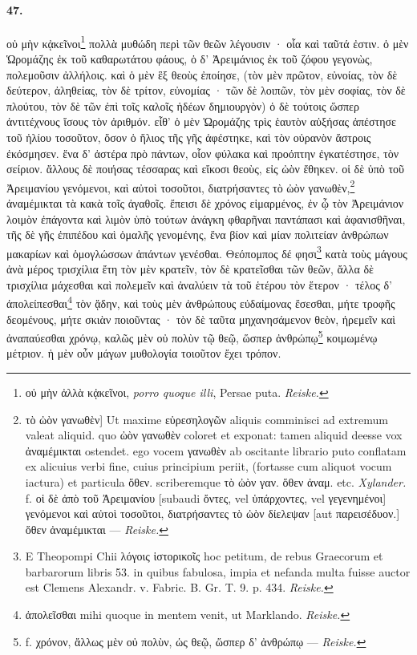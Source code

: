 \documentclass[a4paper, 11pt, oneside, polutonikogreek, german, landscape]{article}
\begin{document}
\paragraph{47.}
οὐ μὴν κᾀκεῖνοι\footnote{οὐ μὴν ἀλλὰ κᾀκεῖνοι, \emph{porro quoque illi}, Persae puta. \emph{Reiske.}} πολλὰ μυθώδη περὶ τῶν θεῶν λέγουσιν · οἷα καὶ ταῦτά ἐστιν. ὁ μὲν Ὡρομάζης ἐκ τοῦ καθαρωτάτου φάους, ὁ δ' Ἀρειμάνιος ἐκ τοῦ ζόφου γεγονὼς, πολεμοῦσιν ἀλλήλοις. καὶ ὁ μὲν ἓξ θεοὺς ἐποίησε, (τὸν μὲν πρῶτον, εὐνοίας, τὸν δὲ δεύτερον, ἀληθείας, τὸν δὲ τρίτον, εὐνομίας · τῶν δὲ λοιπῶν, τὸν μὲν σοφίας, τὸν δὲ πλούτου, τὸν δὲ τῶν ἐπὶ τοῖς καλοῖς ἡδέων δημιουργὸν) ὁ δὲ τούτοις ὥσπερ ἀντιτέχνους ἴσους τὸν ἀριθμόν. εἶθ' ὁ μὲν Ὡρομάζης τρὶς ἑαυτὸν αὐξήσας ἀπέστησε τοῦ ἡλίου τοσοῦτον, ὅσον ὁ ἥλιος τῆς γῆς ἀφέστηκε, καὶ τὸν οὐρανὸν ἄστροις ἐκόσμησεν. ἕνα δ' ἀστέρα πρὸ πάντων, οἷον φύλακα καὶ προόπτην ἐγκατέστησε, τὸν σείριον. ἄλλους δὲ ποιήσας τέσσαρας καὶ εἴκοσι θεοὺς, εἰς ὠὸν ἔθηκεν. οἱ δὲ ὑπὸ τοῦ Ἀρειμανίου γενόμενοι, καὶ αὐτοὶ τοσοῦτοι, διατρήσαντες τὸ ὠὸν γανωθὲν,\footnote{τὸ ὠὸν γανωθὲν] Ut maxime εὑρεσηλογῶν aliquis comminisci ad extremum valeat aliquid. quo ὠὸν γανωθὲν coloret et exponat: tamen aliquid deesse vox ἀναμέμικται ostendet. ego vocem γανωθὲν ab oscitante librario puto conflatam ex alicuius verbi fine, cuius principium periit, (fortasse cum aliquot vocum iactura) et particula ὅθεν. scriberemque τὸ ὠὸν γαν. ὅθεν ἀναμ. etc. \emph{Xylander.} f. οἱ δὲ ἀπὸ τοῦ Ἀρειμανίου [subaudi ὄντες, vel ὑπάρχοντες, vel γεγενημένοι] γενόμενοι καὶ αὐτοὶ τοσοῦτοι, διατρήσαντες τὸ ὠὸν δίελεψαν [aut παρεισέδυον.] ὅθεν ἀναμέμικται --- \emph{Reiske.}} ἀναμέμικται τὰ κακὰ τοῖς ἀγαθοῖς. ἔπεισι δὲ χρόνος εἱμαρμένος, ἐν ᾧ τὸν Ἀρειμάνιον λοιμὸν ἐπάγοντα καὶ λιμὸν ὑπὸ τούτων ἀνάγκη φθαρῆναι παντάπασι καὶ ἀφανισθῆναι, τῆς δὲ γῆς ἐπιπέδου καὶ ὁμαλῆς γενομένης, ἕνα βίον καὶ μίαν πολιτείαν ἀνθρώπων μακαρίων καὶ ὁμογλώσσων ἁπάντων γενέσθαι. Θεόπομπος δέ φησι\footnote{E Theopompi Chii λόγοις ἱστορικοῖς hoc petitum, de rebus Graecorum et barbarorum libris 53. in quibus fabulosa, impia et nefanda multa fuisse auctor est Clemens Alexandr. v. Fabric. B. Gr. T. 9. p. 434. \emph{Reiske.}} κατὰ τοὺς μάγους ἀνὰ μέρος τρισχίλια ἔτη τὸν μὲν κρατεῖν, τὸν δὲ κρατεῖσθαι τῶν θεῶν, ἄλλα δὲ τρισχίλια μάχεσθαι καὶ πολεμεῖν καὶ ἀναλύειν τὰ τοῦ ἑτέρου τὸν ἕτερον · τέλος δ' ἀπολείπεσθαι\footnote{ἀπολεῖσθαι mihi quoque in mentem venit, ut Marklando. \emph{Reiske.}} τὸν ᾅδην, καὶ τοὺς μὲν ἀνθρώπους εὐδαίμονας ἔσεσθαι, μήτε τροφῆς δεομένους, μήτε σκιὰν ποιοῦντας · τὸν δὲ ταῦτα μηχανησάμενον θεὸν, ἠρεμεῖν καὶ ἀναπαύεσθαι χρόνῳ, καλῶς μὲν οὐ πολὺν τῷ θεῷ, ὥσπερ ἀνθρώπῳ\footnote{f. χρόνον, ἄλλως μὲν οὐ πολὺν, ὡς θεῷ, ὥσπερ δ' ἀνθρώπῳ --- \emph{Reiske.}} κοιμωμένῳ μέτριον. ἡ μὲν οὖν μάγων μυθολογία τοιοῦτον ἔχει τρόπον.
\end{document}
